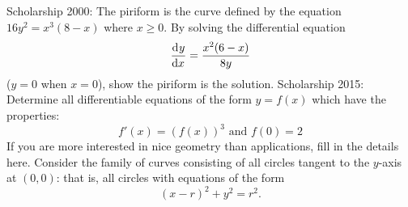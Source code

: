 \begin{questions}
  \questioS Scholarship 2000: The piriform is the curve defined by the equation $ 16y^2 = x^3(8-x) $ where $ x \geq 0 $.
            By solving the differential equation
            \begin{displaymath}
              \dod{y}{x} = \frac{x^2(6-x)}{8y}
            \end{displaymath}
            ($ y = 0 $ when $ x = 0 $), show the piriform is the solution.
  \questioS Scholarship 2015: Determine all differentiable equations of the form $ y = f(x) $ which have the properties:
    \begin{displaymath}
      f'(x) = (f(x))^3 \text{ and } f(0) = 2
    \end{displaymath}
  \questioO If you are more interested in nice geometry than applications, fill in the details here. Consider the family
            of curves consisting of all circles tangent to the $ y$-axis at $ (0,0) $: that is, all circles with equations
            of the form
            \begin{displaymath}
              (x - r)^2 + y^2 = r^2.
            \end{displaymath}
    \begin{parts}

\end{parts}
\end{questions}
